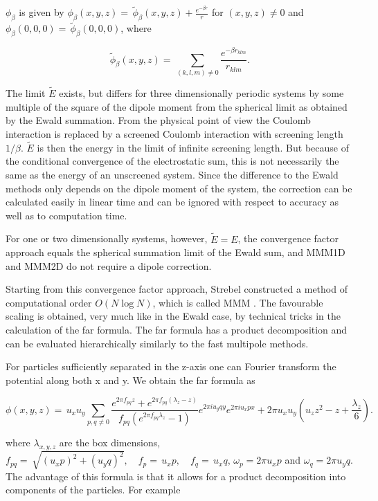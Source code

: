 $\phi_\beta$ is given by $ \phi_\beta(x,y,z)=\,\tilde\phi_\beta(x,y,z)
+ \frac{e^{-\beta r}}{r} $ for $(x,y,z)\neq 0$ and
$\phi_\beta(0,0,0)=\,\tilde\phi_\beta(0,0,0)$, where

\[ \tilde\phi_\beta(x,y,z)=\,\sum_{(k,l,m)\neq 0} \frac{e^{-\beta
    r_{klm}}}{r_{klm}}. \]

The limit $\tilde{E}$ exists, but differs for three dimensionally
periodic systems by some multiple of the square of the dipole moment
from the spherical limit as obtained by the Ewald
summation\citep{smith81a}. From the physical point of view the Coulomb
interaction is replaced by a screened Coulomb interaction with
screening length $1/\beta$. $\tilde{E}$ is then the energy in the
limit of infinite screening length. But because of the conditional
convergence of the electrostatic sum, this is not necessarily the same
as the energy of an unscreened system. Since the difference to the
Ewald methods only depends on the dipole moment of the system, the
correction can be calculated easily in linear time and can be ignored
with respect to accuracy as well as to computation time.

For one or two dimensionally systems, however, $\tilde{E}=E$, \ie the
convergence factor approach equals the spherical summation limit of
the Ewald sum, and MMM1D and MMM2D do not require a dipole correction.

Starting from this convergence factor approach, Strebel constructed a
method of computational order $O(N\log N)$, which is called MMM
\citep{strebel99a}. The favourable scaling is obtained, very much like
in the Ewald case, by technical tricks in the calculation of the far
formula.  The far formula has a product decomposition and can be
evaluated hierarchically similarly to the fast multipole methods.

For particles sufficiently separated in the z-axis one can Fourier
transform the potential along both x and y. We obtain the far formula
as

\[ \phi(x,y,z) =\, u_x u_y\sum_{p,q\neq 0} \frac{e^{2\pi f_{pq}z} +
  e^{2\pi f_{pq}(\lambda_z-z)}}{f_{pq} \left(e^{2\pi f_{pq}\lambda_z}
    - 1\right)} e^{2\pi i u_y q y}e^{2\pi i u_x p x} + 2\pi u_x
u_y\left(u_z z^2 - z + \frac{\lambda_z}{6}\right). \]

where $\lambda_{x,y,z}$ are the box dimensions, $ f_{pq} =\,
\sqrt{(u_x p)^2 + (u_y q)^2},\quad f_p =\, u_x p,\quad f_q =\, u_x q
$, $ \omega_p=2\pi u_x p$ and $\omega_q=2\pi u_y q$. The advantage of
this formula is that it allows for a product decomposition into
components of the particles. For example

